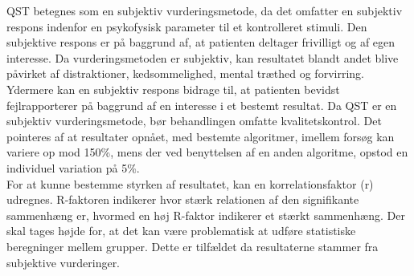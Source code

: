 QST betegnes som en subjektiv vurderingsmetode, da det omfatter en subjektiv respons indenfor en psykofysisk parameter til et kontrolleret stimuli. Den subjektive respons er på baggrund af, at patienten deltager frivilligt og af egen interesse. \citep{Mucke2016} Da vurderingsmetoden er subjektiv, kan resultatet blandt andet blive påvirket af distraktioner, kedsommelighed, mental træthed og forvirring. Ydermere kan en subjektiv respons bidrage til, at patienten bevidst fejlrapporterer på baggrund af en interesse i et bestemt resultat. \citep{Yarnitsky2006} Da QST er en subjektiv vurderingsmetode, bør behandlingen omfatte kvalitetskontrol. Det pointeres af  at resultater opnået, med bestemte algoritmer, imellem forsøg kan variere op mod 150\%, mens der ved benyttelsen af en anden algoritme, opstod en individuel variation på 5\%. \\
For at kunne bestemme styrken af resultatet, kan en korrelationsfaktor (r) udregnes. R-faktoren indikerer hvor stærk relationen af den signifikante sammenhæng er, hvormed en høj R-faktor indikerer et stærkt sammenhæng. Der skal  tages højde for, at det kan være problematisk at udføre statistiske beregninger mellem grupper. Dette er tilfældet da resultaterne stammer fra subjektive vurderinger. \citep{Zaslansky1998} 

